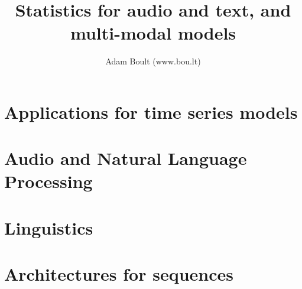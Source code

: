 \documentclass[oneside]{book}
\begin{document}
\author{Adam Boult (www.bou.lt)}
\title{Statistics for audio and text, and multi-modal models}
\maketitle

\setcounter{tocdepth}{0}
\tableofcontents



\part{Applications for time series models}





\part{Audio and Natural Language Processing}




\part{Linguistics}




\part{Architectures for sequences}



\end{document}
